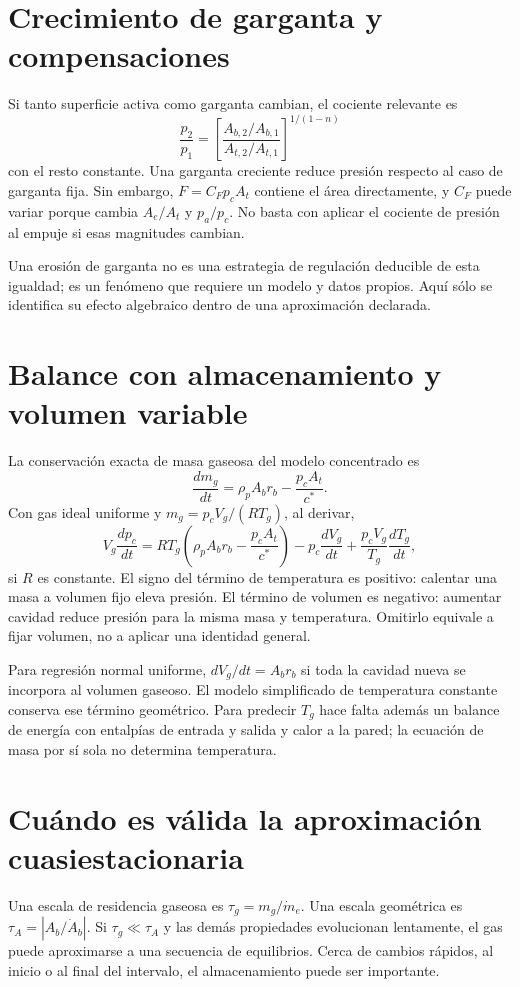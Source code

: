 \section{Crecimiento de garganta y compensaciones}
Si tanto superficie activa como garganta cambian, el cociente relevante es
\[
 \frac{p_2}{p_1}=\left[
 \frac{A_{b,2}/A_{b,1}}{A_{t,2}/A_{t,1}}
 \right]^{1/(1-n)}
\]
con el resto constante. Una garganta creciente reduce presión respecto al caso de garganta fija. Sin embargo, $F=C_Fp_cA_t$ contiene el área directamente, y $C_F$ puede variar porque cambia $A_e/A_t$ y $p_a/p_c$. No basta con aplicar el cociente de presión al empuje si esas magnitudes cambian.

Una erosión de garganta no es una estrategia de regulación deducible de esta igualdad; es un fenómeno que requiere un modelo y datos propios. Aquí sólo se identifica su efecto algebraico dentro de una aproximación declarada.
\section{Balance con almacenamiento y volumen variable}
La conservación exacta de masa gaseosa del modelo concentrado es
\begin{equation}
 \frac{dm_g}{dt}=\rho_pA_br_b-\frac{p_cA_t}{c^*}.
\end{equation}
Con gas ideal uniforme y $m_g=p_cV_g/(RT_g)$, al derivar,
\begin{equation}\label{eq:solidDynamic}
 V_g\frac{dp_c}{dt}=RT_g\left(\rho_pA_br_b-\frac{p_cA_t}{c^*}\right)
 -p_c\frac{dV_g}{dt}+\frac{p_cV_g}{T_g}\frac{dT_g}{dt},
\end{equation}
si $R$ es constante. El signo del término de temperatura es positivo: calentar una masa a volumen fijo eleva presión. El término de volumen es negativo: aumentar cavidad reduce presión para la misma masa y temperatura. Omitirlo equivale a fijar volumen, no a aplicar una identidad general.

Para regresión normal uniforme, $dV_g/dt=A_br_b$ si toda la cavidad nueva se incorpora al volumen gaseoso. El modelo simplificado de temperatura constante conserva ese término geométrico. Para predecir $T_g$ hace falta además un balance de energía con entalpías de entrada y salida y calor a la pared; la ecuación de masa por sí sola no determina temperatura.
\section{Cuándo es válida la aproximación cuasiestacionaria}
Una escala de residencia gaseosa es $\tau_g=m_g/\dot m_e$. Una escala geométrica es $\tau_A=|A_b/\dot A_b|$. Si $\tau_g\ll\tau_A$ y las demás propiedades evolucionan lentamente, el gas puede aproximarse a una secuencia de equilibrios. Cerca de cambios rápidos, al inicio o al final del intervalo, el almacenamiento puede ser importante.

